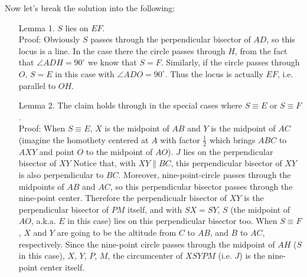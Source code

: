\documentclass[11pt,a4paper]{article}
\begin{document}
\begin{itemize}
Now let's break the solution into the following:
\begin{itemize}
\item [Lemma 1.]  $S$ lies on $EF$.\\
Proof: 
Obviously $S$ passes through the perpendicular bisector of $AD$, so this locus is a line. 
In the case there the circle passes through $H$, from the fact that $\angle ADH=90^{\circ}$ we know that $S=F$.
Similarly, if the circle passes through $O$, $S=E$ in this case with $\angle ADO=90^{\circ}$. 
Thus the locus is actually $EF$, i.e. parallel to $OH$. 
\item [Lemma 2.] The claim holds through in the special cases where $S\equiv E$ or $S\equiv F$.\\
Proof:
When $S\equiv E$, $X$ is the midpoint of $AB$ and $Y$ is the midpoint of $AC$ (imagine the homothety centered at $A$ with factor $\frac 12$ which brings $ABC$ to $AXY$ and point $O$ to the midpoint of $AO$). 
$J$ lies on the perpendicular bisector of $XY$
Notice that, with $XY\parallel BC$, this perpendicular bisector of $XY$ is also perpendicular to $BC$. 
Moreover, nine-point-circle passes through the midpoints of $AB$ and $AC$, so this perpendicular bisector passes through the nine-point center. 
Therefore the perpendicualr bisector of $XY$ is the perpendicular bisector of $PM$ itself, 
and with $SX=SY$, $S$ (the midpoint of $AO$, a.k.a. $E$ in this case) lies on this perpendicular bisector too. 
When $S\equiv F$, $X$ and $Y$ are going to be the altitude from $C$ to $AB$, and $B$ to $AC$, respectively. 
Since the nine-point circle passes through the midpoint of $AH$ ($S$ in this case), $X$, $Y$, $P$, $M$, 
 the circumcenter of $XSYPM$ (i.e. $J$) is the nine-point center itself. 
\end{itemize}


\end{itemize}
\end{document}
